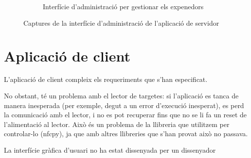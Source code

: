 \begin{figure}[H]
\begin{subfigure}[b]{0.45\textwidth}
		\caption{Interfície d'administració per gestionar els expenedors}
		\label{fig:admin2}
	\end{subfigure}
	\caption{Captures de la interfície d'administració de l'aplicació de servidor}
	\label{fig:intro-example}
\end{figure}

\section{Aplicació de client}
L'aplicació de client compleix els requeriments que s'han especificat.

No obstant, té un problema amb el lector de targetes: si l'aplicació es tanca de manera inesperada (per exemple, degut a un error d'execució inesperat), es perd la comunicació amb el lector, i no es pot recuperar fins que no se li fa un reset de l'alimentació al lector. Això és un problema de la llibreria que utilitzem per controlar-lo (nfcpy), ja que amb altres llibreries que s'han provat això no passava.

La interfície gràfica d'usuari no ha estat dissenyada per un dissenyador

